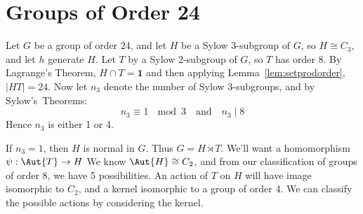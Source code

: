 \section{Groups of Order 24}
Let \(G\) be a group of order 24, and let \(H\) be a Sylow 3-subgroup of \(G\), so \(H \cong C_3\), and let \(h\)
generate \(H\).
Let \(T\) by a Sylow 2-subgroup of \(G\), so \(T\) has order 8.
By Lagrange's Theorem, \(H \cap T = \bm{1}\) and then applying Lemma~\ref{lem:setprodorder}, \(|HT| = 24\).
Now let \(n_3\) denote the number of Sylow 3-subgroups, and by Sylow's~Theorems:
\[n_3 \equiv 1\ \mod{3} \quad \text{and} \quad n_3 \mid 8\]
Hence \(n_3\) is either 1 or 4.

If \(n_3 = 1\), then \(H\) is normal in \(G\).
Thus \(G = H \rtimes T\).
We'll want a homomorphism \(\psi: \Aut{T} \to H\)
We know \(\Aut{H} \cong C_2\), and from our classification of groups of order 8, we have 5 possibilities.
An action of \(T\) on \(H\) will have image isomorphic to \(C_2\), and a kernel isomorphic to a group of order 4.
We can classify the possible actions by considering the kernel.

